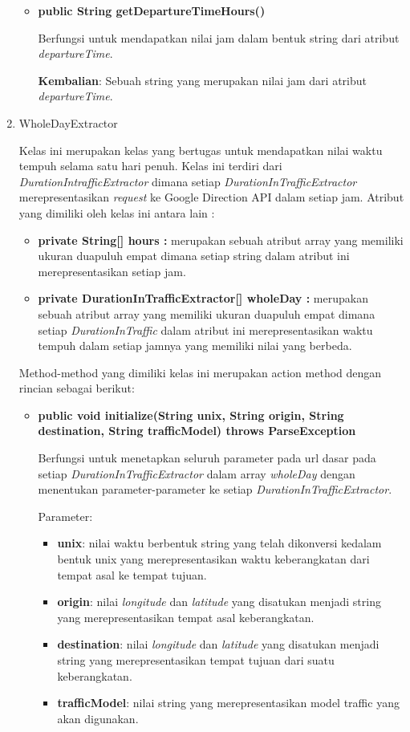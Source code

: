 \begin{enumerate}
\begin{itemize}
		\item \textbf{public String getDepartureTimeHours()}  
		
		Berfungsi untuk mendapatkan nilai jam dalam bentuk string dari atribut \textit{departureTime}.
		
	\textbf{Kembalian}: Sebuah string yang merupakan nilai jam dari atribut \textit{departureTime}.
	\end{itemize}
	
	\item WholeDayExtractor
	
	Kelas ini merupakan kelas yang bertugas untuk mendapatkan nilai waktu tempuh selama satu hari penuh. Kelas ini terdiri dari \textit{DurationIntrafficExtractor} dimana setiap \textit{DurationInTrafficExtractor} merepresentasikan \textit{request} ke Google Direction API dalam setiap jam. Atribut yang dimiliki oleh kelas ini antara lain :
	\begin{itemize}
		\item \textbf{private String[] hours :} merupakan sebuah atribut array yang memiliki ukuran duapuluh empat dimana setiap string dalam atribut ini merepresentasikan setiap jam.
		\item \textbf{private DurationInTrafficExtractor[] wholeDay :} merupakan sebuah atribut array yang memiliki ukuran duapuluh empat dimana setiap \textit{DurationInTraffic} dalam atribut ini merepresentasikan waktu tempuh dalam setiap jamnya yang memiliki nilai yang berbeda.
	\end{itemize}
	
	Method-method yang dimiliki kelas ini merupakan action method dengan rincian sebagai berikut:
	
	\begin{itemize}
		\item \textbf{public void initialize(String unix, String origin, String destination, String trafficModel) throws ParseException}
		
		Berfungsi untuk menetapkan seluruh parameter pada url dasar pada setiap \textit{DurationInTrafficExtractor} dalam array \textit{wholeDay} dengan menentukan parameter-parameter ke setiap \textit{DurationInTrafficExtractor}.
		
		Parameter:
	\begin{itemize}
		\item \textbf{unix}: nilai waktu berbentuk string yang telah dikonversi kedalam bentuk unix yang merepresentasikan waktu keberangkatan dari tempat asal ke tempat tujuan.
		\item \textbf{origin}: nilai \textit{longitude} dan \textit{latitude} yang disatukan menjadi string yang merepresentasikan tempat asal keberangkatan.
		\item \textbf{destination}: nilai \textit{longitude} dan \textit{latitude} yang disatukan menjadi string yang merepresentasikan tempat tujuan dari suatu keberangkatan.
		\item \textbf{trafficModel}: nilai string yang merepresentasikan model traffic yang akan digunakan.
	\end{itemize}
		

\end{itemize}
\end{enumerate}
